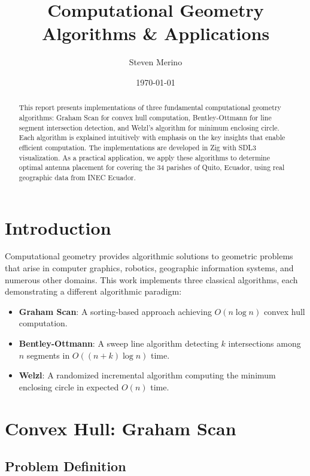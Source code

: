\documentclass[11pt,a4paper]{article}
\title{Computational Geometry Algorithms \& Applications}
\author{Steven Merino}
\date{\today}
\begin{document}
\maketitle

\begin{abstract}
This report presents implementations of three fundamental computational geometry algorithms: Graham Scan for convex hull computation, Bentley-Ottmann for line segment intersection detection, and Welzl's algorithm for minimum enclosing circle. Each algorithm is explained intuitively with emphasis on the key insights that enable efficient computation. The implementations are developed in Zig with SDL3 visualization. As a practical application, we apply these algorithms to determine optimal antenna placement for covering the 34 parishes of Quito, Ecuador, using real geographic data from INEC Ecuador.
\end{abstract}

\section{Introduction}

Computational geometry provides algorithmic solutions to geometric problems that arise in computer graphics, robotics, geographic information systems, and numerous other domains. This work implements three classical algorithms, each demonstrating a different algorithmic paradigm:

\begin{itemize}
    \item \textbf{Graham Scan}: A sorting-based approach achieving $O(n \log n)$ convex hull computation.
    \item \textbf{Bentley-Ottmann}: A sweep line algorithm detecting $k$ intersections among $n$ segments in $O((n+k) \log n)$ time.
    \item \textbf{Welzl}: A randomized incremental algorithm computing the minimum enclosing circle in expected $O(n)$ time.
\end{itemize}

\section{Convex Hull: Graham Scan}

\subsection{Problem Definition}
\end{document}
